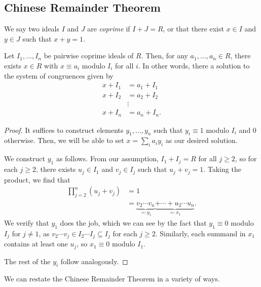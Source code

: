 \documentclass[10pt]{mypackage}
\begin{document}
\subsection{Chinese Remainder Theorem}%
\begin{definition}
  We say two ideals $I$ and $J$ are \textit{coprime} if $I + J = R$, or that there exist $x\in I$ and $y\in J$ such that $x + y = 1$.
\end{definition}
\begin{theorem}
  Let $I_1,\dots,I_n$ be pairwise coprime ideals of $R$. Then, for any $a_1,\dots,a_n\in R$, there exists $x\in R$ with $x\equiv a_i$ modulo $I_i$ for all $i$. In other words, there a solution to the system of congruences given by
  \begin{align*}
    x + I_1 &= a_1 + I_1\\
    x + I_2 &= a_2 + I_2\\
            &\vdots\\
    x + I_n &= a_n + I_n.
  \end{align*}
\end{theorem}
\begin{proof}
  It suffices to construct elements $y_1,\dots,y_n$ such that $y_i\equiv 1$ modulo $I_i$ and $0$ otherwise. Then, we will be able to set $x = \sum_{i} a_iy_i$ as our desired solution.\newline

  We construct $y_1$ as follows. From our assumption, $I_1 + I_j = R$ for all $j \geq 2$, so for each $j\geq 2$, there exists $u_j\in I_1$ and $v_j\in I_j$ such that $u_j + v_j = 1$. Taking the product, we find that
  \begin{align*}
    \prod_{j=2}^{n} \left( u_j + v_j \right) &= 1\\
                                             &= \underbrace{v_2 \cdots v_n}_{\eqcolon y_1} \underbrace{+ \cdots + u_2\cdots u_n}_{\eqcolon x_1}.
  \end{align*}
  We verify that $y_1$ does the job, which we can see by the fact that $y_1 \equiv 0$ modulo $I_j$ for $j\neq 1$, as $v_2\cdots v_j\in I_2\cdots I_j\subseteq I_j$ for each $j\geq 2$. Similarly, each summand in $x_1$ contains at least one $u_j$, so $x_1\equiv 0$ modulo $I_1$.\newline

  The rest of the $y_i$ follow analogously.
\end{proof}
We can restate the Chinese Remainder Theorem in a variety of ways.
\end{document}
